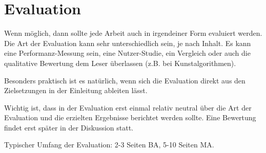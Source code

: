 \chapter{Evaluation}

Wenn möglich, dann sollte jede Arbeit auch in irgendeiner Form evaluiert werden. Die Art der Evaluation kann sehr unterschiedlich sein, je nach Inhalt. Es kann eine Performanz-Messung sein, eine Nutzer-Studie, ein Vergleich oder auch die qualitative Bewertung dem Leser überlassen (z.B. bei Kunstalgorithmen).

Besonders praktisch ist es natürlich, wenn sich die Evaluation direkt aus den Zielsetzungen in der Einleitung ableiten lässt.

Wichtig ist, dass in der Evaluation erst einmal relativ neutral über die Art der Evaluation und die erzielten Ergebnisse berichtet werden sollte. Eine Bewertung findet erst später in der Diskussion statt.

Typischer Umfang der Evaluation: 2-3 Seiten BA, 5-10 Seiten MA. 